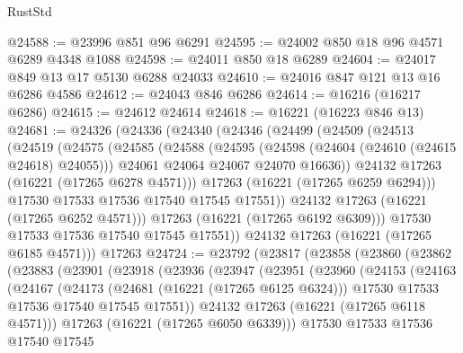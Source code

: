 \begin{lexlean}{RustStd}
\begin{coremodule}
@24588 := @23996 @851 @96 @6291
@24595 := @24002 @850 @18 @96 @4571 @6289 @4348 @1088
@24598 := @24011 @850 @18 @6289
@24604 := @24017 @849 @13 @17 @5130 @6288 @24033
@24610 := @24016 @847 @121 @13 @16 @6286 @4586
@24612 := @24043 @846 @6286
@24614 := @16216 (@16217 @6286)
@24615 := @24612 @24614
@24618 := @16221 (@16223 @846 @13)
@24681 := @24326
    (@24336
      (@24340
        (@24346
          (@24499
            (@24509
              (@24513
                (@24519
                  (@24575
                    (@24585
                      (@24588
                        (@24595
                          (@24598 (@24604 (@24610 (@24615 @24618) @24055)))
                          @24061
                          @24064
                          @24067
                          @24070
                          @16636))
                      @24132
                      @17263
                      (@16221 (@17265 @6278 @4571)))
                    @17263
                    (@16221 (@17265 @6259 @6294)))
                  @17530
                  @17533
                  @17536
                  @17540
                  @17545
                  @17551))
              @24132
              @17263
              (@16221 (@17265 @6252 @4571)))
            @17263
            (@16221 (@17265 @6192 @6309)))
          @17530
          @17533
          @17536
          @17540
          @17545
          @17551))
      @24132
      @17263
      (@16221 (@17265 @6185 @4571)))
    @17263
@24724 := @23792
    (@23817
      (@23858
        (@23860
          (@23862
            (@23883
              (@23901
                (@23918
                  (@23936
                    (@23947
                      (@23951
                        (@23960
                          (@24153
                            (@24163
                              (@24167
                                (@24173
                                  (@24681 (@16221 (@17265 @6125 @6324)))
                                  @17530
                                  @17533
                                  @17536
                                  @17540
                                  @17545
                                  @17551))
                              @24132
                              @17263
                              (@16221 (@17265 @6118 @4571)))
                            @17263
                            (@16221 (@17265 @6050 @6339)))
                          @17530
                          @17533
                          @17536
                          @17540
                          @17545

\end{coremodule}
\end{lexlean}
